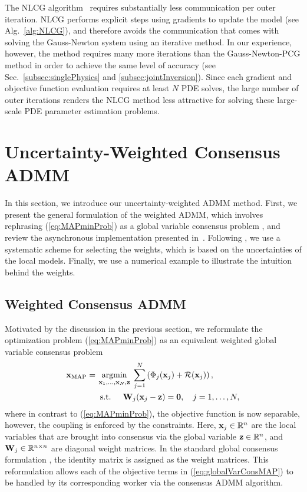\documentclass[11pt]{article}          %
\DeclareMathOperator*{\argmin}{argmin}
\newcommand{\bbR}{\mathbb{R}}
\newcommand{\bfW}{{\bf W}}
\newcommand{\bfx}{{\bf  x}}
\newcommand{\bfz}{{\bf z}}
\begin{document}
The NLCG algorithm~\cite{hager2005new} requires substantially less communication per outer iteration. NLCG performs explicit steps using gradients to update the model (see Alg.~\ref{alg:NLCG}), and therefore avoids the communication that comes with solving the Gauss-Newton system using an iterative method. In our experience, however, the method requires many more iterations than the Gauss-Newton-PCG method in order to achieve the same level of accuracy (see Sec.~\ref{subsec:singlePhysics} and \ref{subsec:jointInversion}). Since each gradient and objective function evaluation requires at least $N$ PDE solves, the large number of outer iterations renders the NLCG method less attractive for solving these large-scale PDE parameter estimation problems. 
\section{Uncertainty-Weighted Consensus ADMM} \label{sec:wADMM}
In this section, we introduce our uncertainty-weighted ADMM method. First, we present the general formulation of the weighted ADMM, which involves rephrasing (\ref{eq:MAPminProb}) as a global variable consensus problem \cite{boyd2011distributed}, and review the asynchronous implementation presented in~\cite{zhang2014asynchronous}. Following \cite{flath2011fast}, we use a systematic scheme for selecting the weights, which is based on the uncertainties of the local models. Finally, we use a numerical example to illustrate the intuition behind the weights.
\subsection{Weighted Consensus ADMM} 
Motivated by the discussion in the previous section, we reformulate the optimization problem (\ref{eq:MAPminProb}) as an equivalent weighted global variable consensus problem
\begin{equation}
\label{eq:globalVarConsMAP}
\begin{split}
  \bfx_{\rm MAP} = \: &\argmin_{\bfx_1,\ldots,\bfx_N,\bfz} \; \sum_{j=1}^N \left(\Phi_j(\bfx_j) + \mathcal{R}(\bfx_j)\right), \\ 
  &\text{ s.t. } \quad \bfW_j(\bfx_j-\bfz) = {\bf0}, \quad j=1,\ldots,N,
\end{split}
\end{equation}
where in contrast to (\ref{eq:MAPminProb}), the objective function is now separable, however, the coupling is enforced by the constraints.
Here, $\bfx_j \in \bbR^n$ are the local variables that are brought into consensus via the global variable $\bfz \in \bbR^n$, and $\bfW_j \in \bbR^{n \times n}$ are diagonal weight matrices. In the standard global consensus formulation \cite{boyd2011distributed}, the identity matrix is assigned as the weight matrices. This reformulation allows each of the objective terms in (\ref{eq:globalVarConsMAP}) to be handled by its corresponding worker via the consensus ADMM algorithm.
\end{document}
